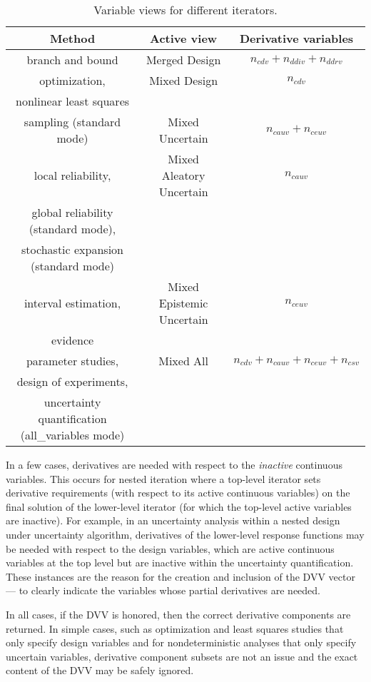 \begin{table}
\centering
\caption{Variable views for different iterators.}
\label{responses:active_tab}\vspace{2mm}
\begin{tabular}{|c|c|c|}
\hline
\textbf{Method} & \textbf{Active view} & \textbf{Derivative variables} \\
\hline
branch and bound         & Merged Design   & $n_{cdv}+n_{ddiv}+n_{ddrv}$ \\
\hline
optimization,            & Mixed Design    & $n_{cdv}$ \\
nonlinear least squares  &                 &           \\
\hline
sampling (standard mode) & Mixed Uncertain & $n_{cauv}+n_{ceuv}$ \\
\hline
local reliability,       & Mixed Aleatory Uncertain & $n_{cauv}$ \\
global reliability (standard mode),  &              &            \\
stochastic expansion (standard mode) &              &            \\
\hline
interval estimation,     & Mixed Epistemic Uncertain & $n_{ceuv}$ \\
evidence                 &                           &            \\
\hline
parameter studies,       & Mixed All & $n_{cdv}+n_{cauv}+n_{ceuv}+n_{csv}$\\
design of experiments,   &           & \\
uncertainty quantification (all\_variables mode) & & \\
\hline
\end{tabular}
\end{table}

In a few cases, derivatives are needed with respect to the
\emph{inactive} continuous variables.  This occurs for nested
iteration where a top-level iterator sets derivative requirements
(with respect to its active continuous variables) on the final
solution of the lower-level iterator (for which the top-level active
variables are inactive).  For example, in an uncertainty analysis
within a nested design under uncertainty algorithm, derivatives of the
lower-level response functions may be needed with respect to the
design variables, which are active continuous variables at the top
level but are inactive within the uncertainty quantification.  These
instances are the reason for the creation and inclusion of the DVV
vector --- to clearly indicate the variables whose partial derivatives
are needed.

In all cases, if the DVV is honored, then the correct derivative
components are returned.  In simple cases, such as optimization and
least squares studies that only specify design variables and for
nondeterministic analyses that only specify uncertain variables,
derivative component subsets are not an issue and the exact content of
the DVV may be safely ignored.
